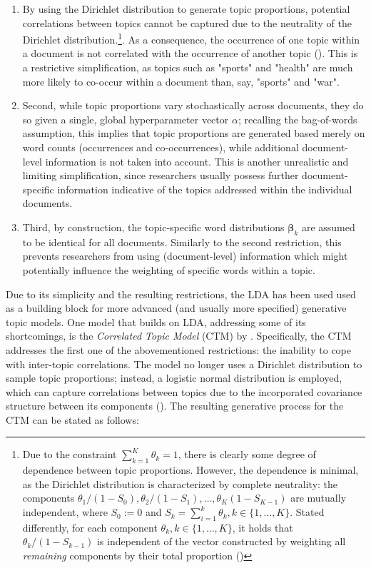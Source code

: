 \begin{enumerate}[label=(\roman*)]
\vspace{-0.25cm}
\item By using the Dirichlet distribution to generate topic proportions, potential correlations between topics cannot be captured due to the neutrality of the Dirichlet distribution.\footnote{Due to the constraint $\sum_{k=1}^{K}\theta_{k}=1$, there is clearly some degree of dependence between topic proportions. However, the dependence is minimal, as the Dirichlet distribution is characterized by complete neutrality: the components $\theta_1/(1-S_0), \theta_2/(1-S_1),\dots, \theta_K(1-S_{K-1})$ are mutually independent, where $S_0:=0$ and $S_k = \sum_{i=1}^{k}\theta_k, k \in \{1,\dots,K\}$. Stated differently, for each component $\theta_k, k \in \{1,\dots,K\}$, it holds that $\theta_k/(1-S_{k-1})$ is independent of the vector constructed by weighting all \textit{remaining} components by their total proportion (\citealp{james1980new})}. As a consequence, the occurrence of one topic within a document is not correlated with the occurrence of another topic (\citealp{blei2007correlated}). This is a restrictive simplification, as topics such as "sports" and "health" are much more likely to co-occur within a document than, say, "sports" and "war".
\vspace{-0.25cm}
\item Second, while topic proportions vary stochastically across documents, they do so given a single, global hyperparameter vector $\alpha$; recalling the bag-of-words assumption, this implies that topic proportions are generated based merely on word counts (occurrences and co-occurrences), while additional document-level information is not taken into account. This is another unrealistic and limiting simplification, since researchers usually possess further document-specific information indicative of the topics addressed within the individual documents.
\vspace{-0.25cm}
\item Third, by construction, the topic-specific word distributions $\boldsymbol{\beta}_k$ are assumed to be identical for all documents. Similarly to the second restriction, this prevents researchers from using (document-level) information which might potentially influence the weighting of specific words within a topic.

\end{enumerate}

\noindent
Due to its simplicity and the resulting restrictions, the LDA has been used used as a building block for more advanced (and usually more specified) generative topic models. One model that builds on LDA, addressing some of its shortcomings, is the \textit{Correlated Topic Model} (CTM) by \cite{blei2007correlated}. Specifically, the CTM addresses the first one of the abovementioned restrictions: the inability to cope with inter-topic correlations. The model no longer uses a Dirichlet distribution to sample topic proportions; instead, a logistic normal distribution is employed, which can capture correlations between topics due to the incorporated covariance structure between its components (\citealp{atchison1980logistic}). The resulting generative process for the CTM can be stated as follows:

